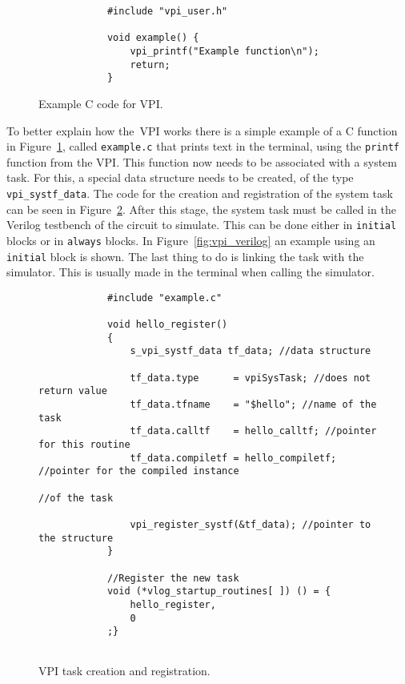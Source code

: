 \lstset{language=C}
\begin{figure}[!htb]
	\begin{minipage}{\linewidth}
		\begin{spacing}{0.7}
			\begin{lstlisting}
			#include "vpi_user.h"
			
			void example() {
				vpi_printf("Example function\n");
				return;
			}
			\end{lstlisting}
		\end{spacing}
	\end{minipage}
	\vspace*{-10mm}
	\caption{Example C code for VPI.}
	\label{fig:vpi_c}
\end{figure}

To better explain how the~\ac{VPI} works there is a simple example of a C
function in Figure~\ref{fig:vpi_c}, called {\tt example.c} that prints text in
the terminal, using the {\tt printf} function from the \ac{VPI}. This function
now needs to be associated with a system task. For this, a special data
structure needs to be created, of the type {\tt vpi\_systf\_data}. The code for
the creation and registration of the system task can be seen in
Figure~\ref{fig:vpi_routine}. After this stage, the system task must be called
in the Verilog testbench of the circuit to simulate. This can be done either in
{\tt initial} blocks or in {\tt always} blocks. In Figure~\ref{fig:vpi_verilog}
an example using an {\tt initial} block is shown. The last thing to do is
linking the task with the simulator. This is usually made in the terminal when
calling the simulator.

\lstset{language=C}
\begin{figure}[!htb]
	\begin{minipage}{\linewidth}
		\begin{spacing}{0.7}
			\begin{lstlisting}
			#include "example.c"
			
			void hello_register()
			{
				s_vpi_systf_data tf_data; //data structure
			
				tf_data.type      = vpiSysTask; //does not return value
				tf_data.tfname    = "$hello"; //name of the task
				tf_data.calltf    = hello_calltf; //pointer for this routine
				tf_data.compiletf = hello_compiletf; //pointer for the compiled instance
																	  //of the task

				vpi_register_systf(&tf_data); //pointer to the structure
			}
			
			//Register the new task
			void (*vlog_startup_routines[ ]) () = {
				hello_register,
				0
			;}
			
			\end{lstlisting}
		\end{spacing}
	\end{minipage}
	\vspace*{-10mm}
	\caption{VPI task creation and registration.}
	\label{fig:vpi_routine}
\end{figure}

